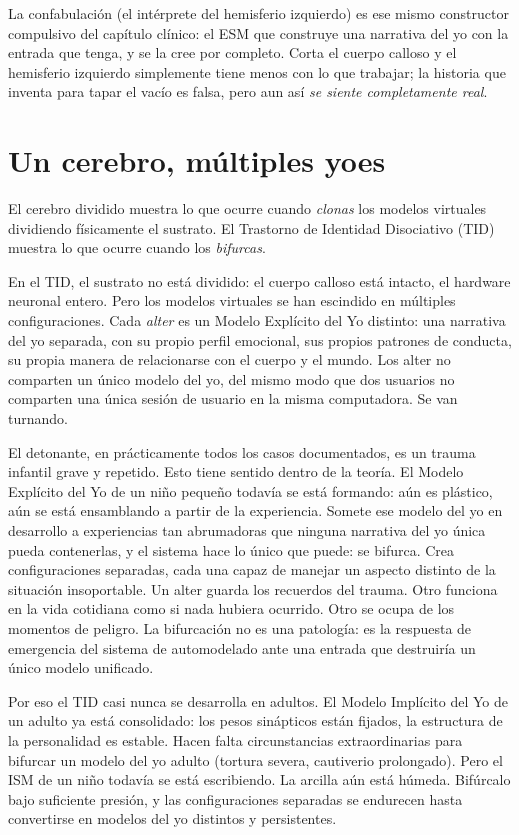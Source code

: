 \documentclass[11pt, twoside, openright]{book}
\begin{document}
La confabulación (el intérprete del hemisferio izquierdo) es ese mismo constructor compulsivo del capítulo clínico: el ESM que construye una narrativa del yo con la entrada que tenga, y se la cree por completo. Corta el cuerpo calloso y el hemisferio izquierdo simplemente tiene menos con lo que trabajar; la historia que inventa para tapar el vacío es falsa, pero aun así \textit{se siente completamente real}.

\section*{Un cerebro, múltiples yoes}

El cerebro dividido muestra lo que ocurre cuando \textit{clonas} los modelos virtuales dividiendo físicamente el sustrato. El Trastorno de Identidad Disociativo (TID) muestra lo que ocurre cuando los \textit{bifurcas}.

En el TID, el sustrato no está dividido: el cuerpo calloso está intacto, el hardware neuronal entero. Pero los modelos virtuales se han escindido en múltiples configuraciones. Cada \textit{alter} es un Modelo Explícito del Yo distinto: una narrativa del yo separada, con su propio perfil emocional, sus propios patrones de conducta, su propia manera de relacionarse con el cuerpo y el mundo. Los alter no comparten un único modelo del yo, del mismo modo que dos usuarios no comparten una única sesión de usuario en la misma computadora. Se van turnando.

El detonante, en prácticamente todos los casos documentados, es un trauma infantil grave y repetido. Esto tiene sentido dentro de la teoría. El Modelo Explícito del Yo de un niño pequeño todavía se está formando: aún es plástico, aún se está ensamblando a partir de la experiencia. Somete ese modelo del yo en desarrollo a experiencias tan abrumadoras que ninguna narrativa del yo única pueda contenerlas, y el sistema hace lo único que puede: se bifurca. Crea configuraciones separadas, cada una capaz de manejar un aspecto distinto de la situación insoportable. Un alter guarda los recuerdos del trauma. Otro funciona en la vida cotidiana como si nada hubiera ocurrido. Otro se ocupa de los momentos de peligro. La bifurcación no es una patología: es la respuesta de emergencia del sistema de automodelado ante una entrada que destruiría un único modelo unificado.

Por eso el TID casi nunca se desarrolla en adultos. El Modelo Implícito del Yo de un adulto ya está consolidado: los pesos sinápticos están fijados, la estructura de la personalidad es estable. Hacen falta circunstancias extraordinarias para bifurcar un modelo del yo adulto (tortura severa, cautiverio prolongado). Pero el ISM de un niño todavía se está escribiendo. La arcilla aún está húmeda. Bifúrcalo bajo suficiente presión, y las configuraciones separadas se endurecen hasta convertirse en modelos del yo distintos y persistentes.
\end{document}
